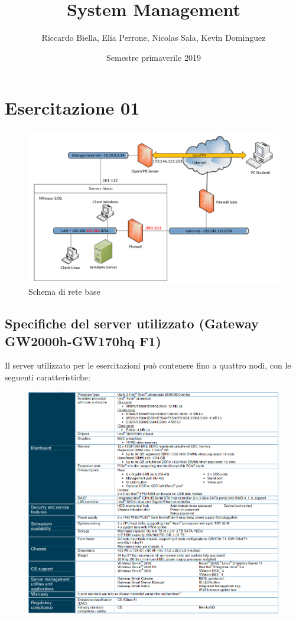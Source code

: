 \documentclass{article}
\title{\Huge System Management \vspace{1cm}}
\author{Riccardo Biella, Elia Perrone, Nicolas Sala, Kevin Dominguez}
\date{Semestre primaverile 2019}
\begin{document}
\maketitle
\thispagestyle{empty}
\pagebreak

\tableofcontents
\lstset{language=C++}
\pagebreak

\section{Esercitazione 01}

\begin{figure}[H]
    \center
    \includegraphics[scale=0.3]{images/schemaRete.png}
    \caption{Schema di rete base}\label{fig:1}
\end{figure}

\subsection{Specifiche del server utilizzato (Gateway GW2000h-GW170hq F1)}
Il server utilizzato per le esercitazioni può contenere fino a quattro nodi, con le seguenti caratteristiche:
\begin{figure}[H]
    \center
    \includegraphics[scale=0.37]{images/specificheServer.png}
\end{figure}
\end{document}
